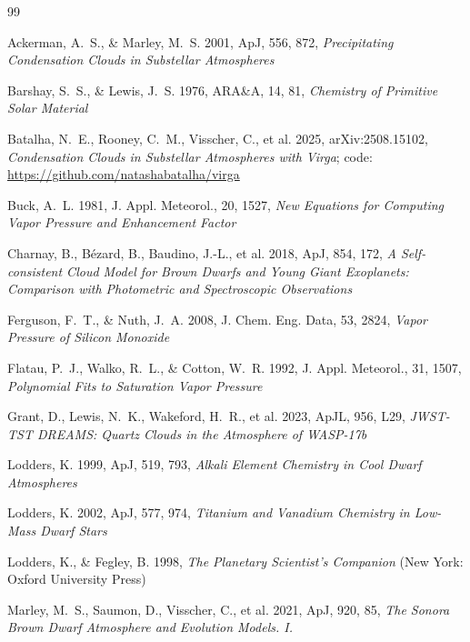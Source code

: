 \documentclass[11pt,a4paper]{article}
\begin{document}
\begin{thebibliography}{99}

Ackerman, A.~S., \& Marley, M.~S. 2001, ApJ, 556, 872,
\emph{Precipitating Condensation Clouds in Substellar Atmospheres}

Barshay, S.~S., \& Lewis, J.~S. 1976, ARA\&A, 14, 81,
\emph{Chemistry of Primitive Solar Material}

Batalha, N.~E., Rooney, C.~M., Visscher, C., et al. 2025,
arXiv:2508.15102,
\emph{Condensation Clouds in Substellar Atmospheres with Virga};
code: \url{https://github.com/natashabatalha/virga}

Buck, A.~L. 1981, J. Appl. Meteorol., 20, 1527,
\emph{New Equations for Computing Vapor Pressure and Enhancement Factor}

Charnay, B., B\'ezard, B., Baudino, J.-L., et al. 2018, ApJ, 854, 172,
\emph{A Self-consistent Cloud Model for Brown Dwarfs and Young Giant
Exoplanets: Comparison with Photometric and Spectroscopic Observations}

Ferguson, F.~T., \& Nuth, J.~A. 2008, J. Chem. Eng. Data, 53, 2824,
\emph{Vapor Pressure of Silicon Monoxide}

Flatau, P.~J., Walko, R.~L., \& Cotton, W.~R. 1992, J. Appl. Meteorol.,
31, 1507, \emph{Polynomial Fits to Saturation Vapor Pressure}

Grant, D., Lewis, N.~K., Wakeford, H.~R., et al. 2023, ApJL, 956, L29,
\emph{JWST-TST DREAMS: Quartz Clouds in the Atmosphere of WASP-17b}

Lodders, K. 1999, ApJ, 519, 793,
\emph{Alkali Element Chemistry in Cool Dwarf Atmospheres}

Lodders, K. 2002, ApJ, 577, 974,
\emph{Titanium and Vanadium Chemistry in Low-Mass Dwarf Stars}

Lodders, K., \& Fegley, B. 1998,
\emph{The Planetary Scientist's Companion} (New York: Oxford University Press)

Marley, M.~S., Saumon, D., Visscher, C., et al. 2021, ApJ, 920, 85,
\emph{The Sonora Brown Dwarf Atmosphere and Evolution Models. I.}


\end{thebibliography}
\end{document}
